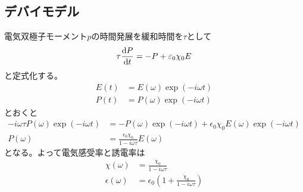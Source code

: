 \subsection{デバイモデル}
    電気双極子モーメント$p$の時間発展を緩和時間を$\tau$として
        \[\tau\dv{P}{t} = -P + \varepsilon_0\chi_0 E\]
    と定式化する。
    \begin{align*}
        E(t) &= E(\omega)\exp(-i\omega t)\\
        P(t) &= P(\omega)\exp(-i\omega t)
    \end{align*}
    とおくと
    \begin{align*}
        -i\omega\tau P(\omega)\exp(-i\omega t) &= -P(\omega)\exp(-i\omega t) + \epsilon_0\chi_0E(\omega)\exp(-i\omega t)\\
        P(\omega) &= \frac{\epsilon_0\chi_0}{1 - i\omega\tau}E(\omega)
    \end{align*}
    となる。よって電気感受率と誘電率は
    \begin{align*}
        \chi(\omega) &= \frac{\chi_0}{1 - i\omega\tau}\\
        \epsilon(\omega) &= \epsilon_0\left(1 + \frac{\chi_0}{1 - i\omega\tau}\right)
    \end{align*}